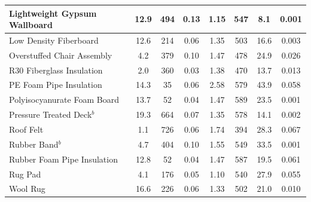 \begin{table}[!h]
\begin{tabular}{|p{6.5cm}|c|c|c|c|c|c|c|}
Lightweight Gypsum Wallboard                      & 12.9 & 494  & 0.13 & 1.15 & 547 & 8.1  & 0.001 \\\hline
Low Density Fiberboard                            & 12.6 & 214  & 0.06 & 1.35 & 503 & 16.6 & 0.003 \\\hline
Overstuffed Chair Assembly                        & 4.2  & 379  & 0.10 & 1.47 & 478 & 24.9 & 0.026 \\\hline
R30 Fiberglass Insulation                         & 2.0  & 360  & 0.03 & 1.38 & 470 & 13.7 & 0.013 \\\hline
PE Foam Pipe Insulation                           & 14.3 & 35   & 0.06 & 2.58 & 579 & 43.9 & 0.058 \\\hline
Polyisocyanurate Foam Board                       & 13.7 & 52   & 0.04 & 1.47 & 589 & 23.5 & 0.001 \\\hline
Pressure Treated Deck$^{b}$                       & 19.3 & 664  & 0.07 & 1.35 & 578 & 14.1 & 0.002 \\\hline
Roof Felt                                         & 1.1  & 726  & 0.06 & 1.74 & 394 & 28.3 & 0.067 \\\hline
Rubber Band$^{b}$                                 & 4.7  & 404  & 0.10 & 1.55 & 549 & 33.5 & 0.001 \\\hline
Rubber Foam Pipe Insulation                       & 12.8 & 52   & 0.04 & 1.47 & 587 & 19.5 & 0.061 \\\hline
Rug Pad                                           & 4.1  & 176  & 0.05 & 1.10 & 540 & 27.9 & 0.055 \\\hline
Wool Rug                                          & 16.6 & 226  & 0.06 & 1.33 & 502 & 21.0 & 0.010 \\\hline
\end{tabular}
\label{Properties_FSRI_Materials_Others}
\end{table}
\vspace{-0.4cm}
\\
\\

